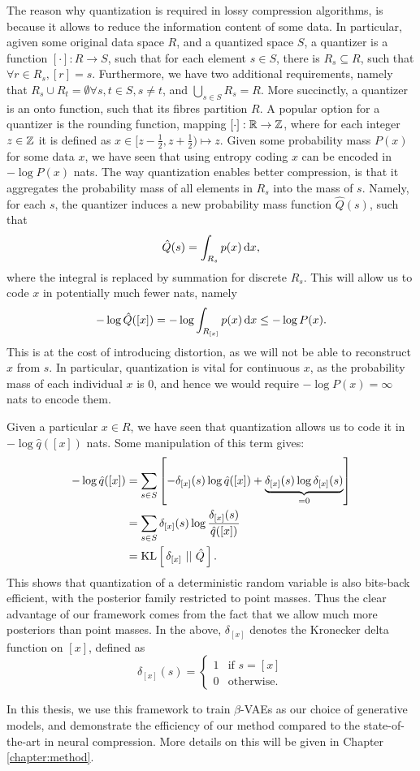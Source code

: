 \par
The reason why quantization is required in lossy compression algorithms, is
because it allows to reduce the information content of some data. In particular,
agiven some original data space $R$, and a quantized space $S$, a quantizer is a
function $[\cdot]: R \rightarrow S$, such that for each element $s \in S$, there
is $R_s \subseteq R$, such that $\forall r \in R_s, [r] = s$. Furthermore, we
have two additional requirements, namely that $R_s \cup R_t = \emptyset \forall
s, t \in S, s \neq t$, and $\bigcup_{s \in S}R_s = R$. More succinctly, a
quantizer is an onto function, such that its fibres partition $R$. A popular
option for a quantizer is the rounding function, mapping $[\cdot]: \mathbb{R}
\rightarrow \mathbb{Z}$, where for each integer $z \in \mathbb{Z}$ it is defined as $x
\in [z - \frac12, z + \frac12) \mapsto z$. Given some probability mass $P(x)$ 
for some data $x$, we have seen that using entropy coding $x$ can be encoded in
$-\log P(x)$ nats. The way quantization enables better compression, is that it
aggregates the probability mass of all elements in $R_s$ into the mass of $s$.
Namely, for each $s$, the quantizer induces a new probability mass function
$\hat{Q}(s)$, such that
\[
  \hat{Q}(s) = \int_{R_s} p(x) \,\text{d} x,
\]
where the integral is replaced by summation for discrete $R_s$. This will allow
us to code $x$ in potentially much fewer nats, namely
\[
  -\log \hat{Q}([x]) = -\log \int_{R_{[x]}} p(x) \,\text{d} x \leq -\log P(x).
\]
This is at the cost of introducing distortion, as we will not be
able to reconstruct $x$ from $s$.
In particular, quantization is vital for continuous $x$, as the probability mass of each
individual $x$ is 0, and hence we would require $-\log P(x) = \infty$ nats to
encode them. 
\par
Given a particular $x \in R$, we have seen that quantization allows us to code
it in $-\log \hat{q}([x])$ nats. Some manipulation of this term gives:
\begin{align*}
  -\log \hat{q}([x]) &= \sum_{s \in S} \left[ -\delta_{[x]}(s)\log \hat{q}([x]) + \underbrace{\delta_{[x]}(s) \log \delta_{[x]}(s)}_{= 0} \right] \\
                     &= \sum_{s \in S} \delta_{[x]}(s)\log\frac{\delta_{[x]}(s)}{\hat{q}([x])} \\
                     &= \mathrm{KL}\left[\,\delta_{[x]}\,\,||\,\,\hat{Q}\,\right].
\end{align*}
This shows that quantization of a deterministic random variable is also
bits-back efficient, with the posterior family restricted to point masses. Thus
the clear advantage of our framework comes from the fact that we allow much more
posteriors than point masses. In the above, $\delta_{[x]}$ denotes the Kronecker
delta function on $[x]$, defined as 
\[
  \delta_{[x]}(s) = 
  \begin{cases}
    1 & \text{if } s = [x] \\
    0 & \text{otherwise}.
  \end{cases}
\]
\par
In this thesis, we use this framework to train $\beta$-VAEs as our choice of
generative models, and demonstrate the efficiency of our method compared to the
state-of-the-art in neural compression. More details on this will be given in
Chapter \ref{chapter:method}. 

